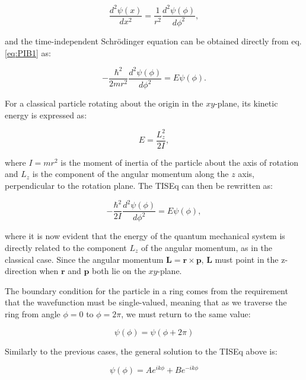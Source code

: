 \documentclass[
  english,
  9pt,
]{extbook}
\theoremstyle{definition}
\theoremstyle{definition}
\theoremstyle{definition}
\theoremstyle{definition}
\theoremstyle{remark}
\begin{document}
\begin{equation}
\frac{d^2\psi(x)}{dx^2} = \frac{1}{r^2} \frac{d^2\psi(\phi)}{d\phi^2},
\label{eq:PIB0}
\end{equation}

and the time-independent Schrödinger equation can be obtained directly from eq. \eqref{eq:PIB1} as:

\begin{equation}
-\frac{\hbar^2}{2m r^2}\frac{d^2\psi(\phi)}{d\phi^2} = E\psi(\phi).
\label{eq:PIR1}
\end{equation}

For a classical particle rotating about the origin in the \(xy\)-plane, its kinetic energy is expressed as:

\begin{equation}
E=\frac{L_z^2}{2I},
\label{eq:PIR1b}
\end{equation}

where \(I = m r^2\) is the moment of inertia of the particle about the axis of rotation and \(L_z\) is the component of the angular momentum along the \(z\) axis, perpendicular to the rotation plane. The TISEq can then be rewritten as:

\begin{equation}
-\frac{\hbar^2}{2I}\frac{d^2\psi(\phi)}{d\phi^2} = E\psi(\phi),
\label{eq:PIR2}
\end{equation}

where it is now evident that the energy of the quantum mechanical system is directly related to the component \(L_z\) of the angular momentum, as in the classical case. Since the angular momentum \(\mathbf{L}=\mathbf{r}\times \mathbf{p}\), \(\mathbf{L}\) must point in the z-direction when \(\mathbf{r}\) and \(\mathbf{p}\) both lie on the \(xy\)-plane.

The boundary condition for the particle in a ring comes from the requirement that the wavefunction must be single-valued, meaning that as we traverse the ring from angle \(\phi = 0\) to \(\phi = 2\pi\), we must return to the same value:

\begin{equation}
\psi(\phi) = \psi(\phi + 2\pi)
\label{eq:PIR3}
\end{equation}

Similarly to the previous cases, the general solution to the TISEq above is:

\begin{equation}
\psi(\phi) = A e^{ik\phi} + B e^{-ik\phi}
\label{eq:PIR4}
\end{equation}
\end{document}
